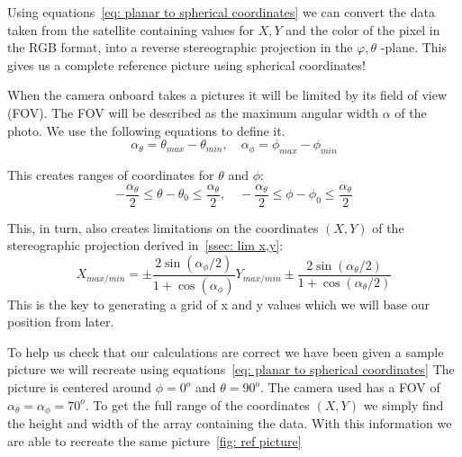 \documentclass[reprint,english,notitlepage]{revtex4-2}
\begin{document}
Using equations~\ref{eq: planar to spherical coordinates} we can convert the data taken from the satellite containing values for $ X,Y  $ and the color of the pixel in the RGB format, into a reverse stereographic projection in the $ \varphi, \theta $ -plane.
This gives us a complete reference picture using spherical coordinates!

When the camera onboard takes a pictures it will be limited by its field of view (FOV).
The FOV will be described as the maximum angular width $ \alpha $ of the photo.
We use the following equations to define it.
\begin{equation} \label{eq: max angular width}
	α _{\theta} = θ _{max} - \theta _{min}, \quad α _{\phi} = ϕ _{max} - ϕ _{min}
\end{equation}

This creates ranges of coordinates for $\theta$ and $\phi$:
\begin{equation}\label{eq: limitations phi and theta}
  - \frac{\alpha _{\theta}}{2} \le θ - θ _{0} \le \frac{\alpha _{\theta }}{2}, \quad - \frac{\alpha _{\theta}}{2} \le ϕ  - ϕ _{0} \le \frac{\alpha _{\theta }}{2}
\end{equation}

This, in turn, also creates limitations on the coordinates $ (X,Y) $ of the stereographic projection derived in~\ref{ssec: lim x,y}:
\begin{subequations} \label{eq: limitations X and Y lim}
	\begin{equation}
		X _{max / min} = ± \frac{2 \sin (α _{\phi} / 2)}{1 + \cos (\alpha _{\phi})}
	  \end{equation}
	  
	  
	\begin{equation}
		Y _{max / min} ± \frac{2 \sin (\alpha _{\theta}  / 2)}{1 + \cos (α _{\theta}/2)}
	\end{equation}
	
\end{subequations}
This is the key to generating a grid of x and y values which we will base our position from later. 

To help us check that our calculations are correct we have been given a sample picture we will recreate using equations~\ref{eq: planar to spherical coordinates}
The picture is centered around $ \phi = 0^{o} $ and $ \theta = 90^{o} $.
The camera used has a FOV of $ \alpha_{\theta} = \alpha_{\phi} = 70^{o} $.
To get the full range of the coordinates $ (X,Y) $ we simply find the height and width of the array containing the data.
With this information we are able to recreate the same picture~\ref{fig: ref picture}
\end{document}
